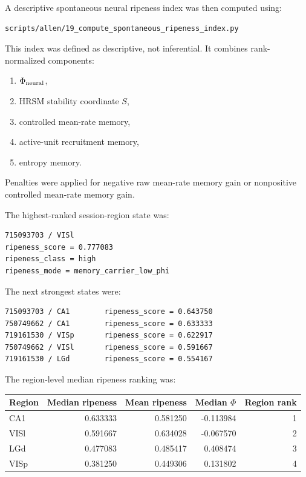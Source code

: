 A descriptive spontaneous neural ripeness index was then computed using:

\begin{verbatim}
scripts/allen/19_compute_spontaneous_ripeness_index.py
\end{verbatim}

This index was defined as descriptive, not inferential. It combines rank-normalized components:

\begin{enumerate}
    \item \(\Phi_{\rm neural}\),
    \item HRSM stability coordinate \(S\),
    \item controlled mean-rate memory,
    \item active-unit recruitment memory,
    \item entropy memory.
\end{enumerate}

Penalties were applied for negative raw mean-rate memory gain or nonpositive controlled mean-rate memory gain.

The highest-ranked session-region state was:

\begin{verbatim}
715093703 / VISl
ripeness_score = 0.777083
ripeness_class = high
ripeness_mode = memory_carrier_low_phi
\end{verbatim}

The next strongest states were:

\begin{verbatim}
715093703 / CA1        ripeness_score = 0.643750
750749662 / CA1        ripeness_score = 0.633333
719161530 / VISp       ripeness_score = 0.622917
750749662 / VISl       ripeness_score = 0.591667
719161530 / LGd        ripeness_score = 0.554167
\end{verbatim}

The region-level median ripeness ranking was:

\begin{center}
\begin{tabular}{lrrrr}
\hline
Region & Median ripeness & Mean ripeness & Median \(\Phi\) & Region rank \\
\hline
CA1 & 0.633333 & 0.581250 & -0.113984 & 1 \\
VISl & 0.591667 & 0.634028 & -0.067570 & 2 \\
LGd & 0.477083 & 0.485417 & 0.408474 & 3 \\
VISp & 0.381250 & 0.449306 & 0.131802 & 4 \\
\hline
\end{tabular}
\end{center}

